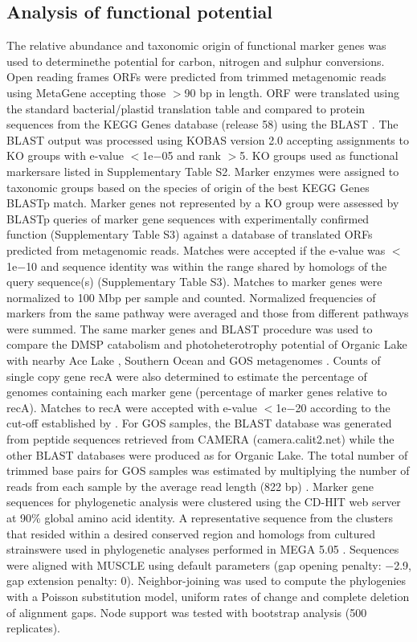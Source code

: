 \subsection{Analysis of functional potential}
The relative abundance and taxonomic origin of functional marker genes was used to determinethe potential for carbon, nitrogen and sulphur conversions.
Open reading frames \acp{ORF} were predicted from trimmed metagenomic reads using MetaGene \cite{Noguchi2006} accepting those $>$90 bp in length. 
\ac{ORF} were translated using the standard bacterial/plastid translation table and compared to protein sequences from the \ac{KEGG} Genes database (release 58) using the \ac{BLAST} \cite{Altschul1990}. 
The \ac{BLAST} output was processed using \ac{KOBAS} version 2.0 \cite{Xie2011} accepting assignments to \ac{KO} groups with e-value $<$1e$-$05 and rank $>$5. 
\ac{KO} groups used as functional markersare listed in Supplementary Table S2. 
Marker enzymes were assigned to taxonomic groups based on the species of origin of the best \ac{KEGG} Genes \ac{BLAST}p match. 
Marker genes not represented by a \ac{KO} group were assessed by \ac{BLAST}p queries of marker gene sequences with experimentally confirmed function (Supplementary Table S3) against a database of translated \acp{ORF} predicted from metagenomic reads. 
Matches were accepted if the e-value was $<$1e$-$10 and sequence identity was within the range shared by homologs of the query sequence(s) (Supplementary Table S3).
Matches to marker genes were normalized to 100 Mbp per sample and counted. 
Normalized frequencies of markers from the same pathway were averaged and those from different pathways were summed. 
The same marker genes and \ac{BLAST} procedure was used to compare the \ac{DMSP} catabolism and photoheterotrophy potential of Organic Lake with nearby Ace Lake \cite{Lauro2011}, Southern Ocean \cite{Wilkins2012b} and \ac{GOS} metagenomes \cite{Rusch2007}. 
Counts of single copy gene recA were also determined to estimate the percentage of genomes containing each marker gene (percentage of marker genes relative to recA). 
Matches to recA were accepted with e-value $<$1e$-$20 according to the cut-off established by \citet{Howard2008}. 
For \ac{GOS} samples, the \ac{BLAST} database was generated from peptide sequences retrieved from \ac{CAMERA} (camera.calit2.net) while the other \ac{BLAST} databases were produced as for Organic Lake. 
The total number of trimmed base pairs for \ac{GOS} samples was estimated by multiplying the number of reads from each sample by the average read length (822 bp) \cite{Rusch2007}. 
Marker gene sequences for phylogenetic analysis were clustered using the CD-HIT web server \cite{Huang2010} at 90\% global amino acid identity. 
A representative sequence from the clusters that resided within a desired conserved region and homologs from cultured strainswere used in phylogenetic analyses performed in MEGA 5.05 \cite{Tamura2011}. 
Sequences were aligned with MUSCLE \cite{Robert2004} using default parameters (gap opening penalty: $-$2.9, gap extension penalty: 0). 
Neighbor-joining was used to compute the phylogenies with a Poisson substitution model, uniform rates of change and complete deletion of alignment gaps. 
Node support was tested with bootstrap analysis (500 replicates). 



